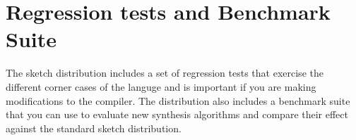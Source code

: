 
\section{Regression tests and Benchmark Suite}

The sketch distribution includes a set of regression tests that exercise the different corner cases of the languge and is important if you are making modifications to the compiler. The distribution also includes a benchmark suite that you can use to evaluate new synthesis algorithms and compare their effect against the standard sketch distribution.